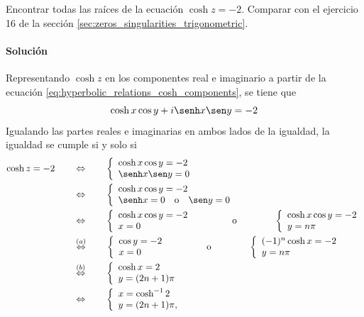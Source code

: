 \documentclass[a4paper]{report}
\begin{document}
Encontrar todas las raíces de la ecuación \(\cosh z=-2\). Comparar con el ejercicio 16 de la sección \ref{sec:zeros_singularities_trigonometric}.

\paragraph{Solución} Representando \(\cosh z\) en los componentes real e imaginario a partir de la ecuación \ref{eq:hyperbolic_relations_cosh_components}, se tiene que 
\[
 \cosh x\cos y+i\senh x\sen y=-2
\]
Igualando las partes reales e imaginarias en ambos lados de la igualdad, la igualdad se cumple si y solo si
\begin{align*}
 \cosh z=-2
 \qquad&\Leftrightarrow\qquad
  \left\{ 
  \begin{array}{l}
   \cosh x\cos y=-2\\
   \senh x\sen y=0
  \end{array}\right.\\
 \qquad&\Leftrightarrow\qquad
  \left\{ 
  \begin{array}{l}
   \cosh x\cos y=-2\\
   \senh x=0\quad\textrm{o}\quad\sen y=0
  \end{array}\right.\\
  \qquad&\Leftrightarrow\qquad
  \left\{ 
  \begin{array}{l}
   \cosh x\cos y=-2\\
   x=0
  \end{array}\right.
  \qquad\qquad\textrm{o}\qquad\qquad
  \left\{ 
  \begin{array}{l}
   \cosh x\cos y=-2\\
   y=n\pi
  \end{array}\right.\\
  \qquad&\overset{(a)}{\Leftrightarrow}\qquad
  \left\{ 
  \begin{array}{l}
   \cos y=-2\\
   x=0
  \end{array}\right.
  \qquad\qquad\textrm{o}\qquad\qquad
  \left\{ 
  \begin{array}{l}
   (-1)^n\cosh x=-2\\
   y=n\pi
  \end{array}\right.\\
  \qquad&\overset{(b)}{\Leftrightarrow}\qquad
  \left\{ 
  \begin{array}{l}
   \cosh x=2\\
   y=(2n+1)\pi
  \end{array}\right.\\
  \qquad&\Leftrightarrow\qquad
  \left\{ 
  \begin{array}{l}
   x=\cosh^{-1}2\\
   y=(2n+1)\pi,
  \end{array}\right.
\end{align*}
\end{document}
